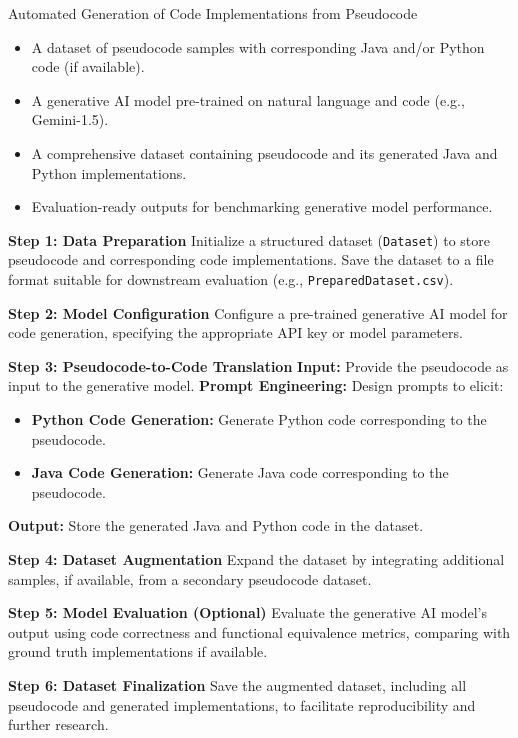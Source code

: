 \documentclass{dhbenelux}
\begin{document}
\begin{algorithm}
\caption{Automated Generation of Code Implementations from Pseudocode}
\label{alg:code_generation}
\begin{algorithmic}[1]
\Require 
\begin{itemize}
    \item A dataset of pseudocode samples with corresponding Java and/or Python code (if available).
    \item A generative AI model pre-trained on natural language and code (e.g., Gemini-1.5).
\end{itemize}
\Ensure 
\begin{itemize}
    \item A comprehensive dataset containing pseudocode and its generated Java and Python implementations.
    \item Evaluation-ready outputs for benchmarking generative model performance.
\end{itemize}

\State \textbf{Step 1: Data Preparation}
\State Initialize a structured dataset (\texttt{Dataset}) to store pseudocode and corresponding code implementations.
\State Save the dataset to a file format suitable for downstream evaluation (e.g., \texttt{PreparedDataset.csv}).

\State \textbf{Step 2: Model Configuration}
\State Configure a pre-trained generative AI model for code generation, specifying the appropriate API key or model parameters.

\State \textbf{Step 3: Pseudocode-to-Code Translation}
    \State \textbf{Input:} Provide the pseudocode as input to the generative model.
    \State \textbf{Prompt Engineering:} Design prompts to elicit:
    \begin{itemize}
        \item \textbf{Python Code Generation:} Generate Python code corresponding to the pseudocode.
        \item \textbf{Java Code Generation:} Generate Java code corresponding to the pseudocode.
    \end{itemize}
    \State \textbf{Output:} Store the generated Java and Python code in the dataset.
\EndFor

\State \textbf{Step 4: Dataset Augmentation}
\State Expand the dataset by integrating additional samples, if available, from a secondary pseudocode dataset.

\State \textbf{Step 5: Model Evaluation (Optional)}
\State Evaluate the generative AI model's output using code correctness and functional equivalence metrics, comparing with ground truth implementations if available.

\State \textbf{Step 6: Dataset Finalization}
\State Save the augmented dataset, including all pseudocode and generated implementations, to facilitate reproducibility and further research.

\end{algorithmic}
\end{algorithm}
\end{document}
